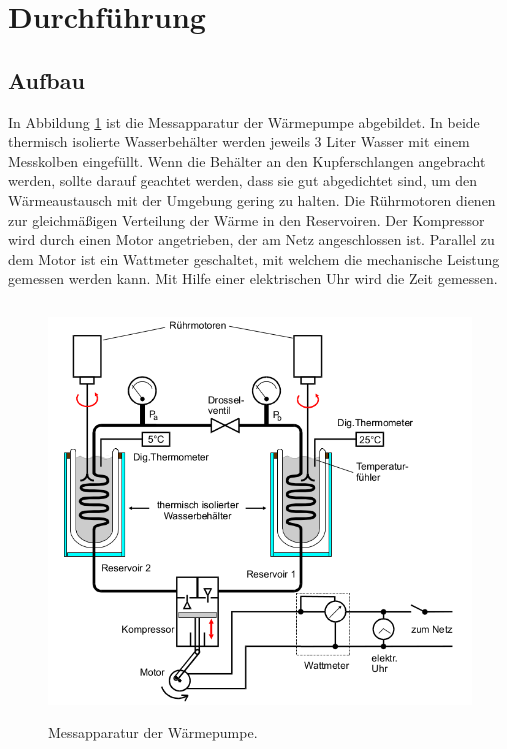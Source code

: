 \section{Durchführung}
\label{sec:Durchführung}

\subsection{Aufbau}

In Abbildung \ref{fig:WaermepumpeAufbau} ist die Messapparatur der
Wärmepumpe abgebildet. In beide thermisch isolierte Wasserbehälter werden
jeweils 3 Liter Wasser mit einem Messkolben eingefüllt. Wenn die Behälter an den
Kupferschlangen angebracht
werden, sollte darauf geachtet werden, dass sie gut abgedichtet sind, um den
Wärmeaustausch mit der Umgebung gering zu halten. Die Rührmotoren dienen zur
gleichmäßigen Verteilung der Wärme in den Reservoiren.
Der Kompressor wird durch einen Motor angetrieben, der am Netz angeschlossen
ist. Parallel zu dem Motor ist ein Wattmeter geschaltet, mit welchem die
mechanische Leistung gemessen werden kann. Mit Hilfe einer elektrischen Uhr
wird die Zeit gemessen.

\newpage

\begin{figure}
  \centering
  \includegraphics[height=11cm]{WaermepumpeAufbau.png}
  \caption{Messapparatur der Wärmepumpe.\cite{anleitung}}
  \label{fig:WaermepumpeAufbau}
\end{figure}

